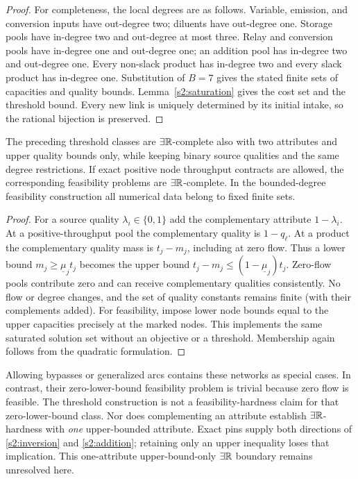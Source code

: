 \begin{proof}
For completeness, the local degrees are as follows. Variable, emission,
and conversion inputs have out-degree two; diluents have out-degree
one. Storage pools have in-degree two and out-degree at most three.
Relay and conversion pools have in-degree one and out-degree one;
an addition pool has in-degree two and out-degree one. Every non-slack
product has in-degree two and every slack product has in-degree one.
Substitution of $B=7$ gives the stated finite sets of capacities and
quality bounds. Lemma~\ref{s2:saturation} gives the cost set and the
threshold bound. Every new link is uniquely determined by its initial
intake, so the rational bijection is preserved.
\end{proof}

\begin{corollary}\label{s2:variants}
The preceding threshold classes are $\exists\mathbb R$-complete also with two
attributes and upper quality bounds only, while keeping binary source
qualities and the same degree restrictions. If exact positive node
throughput contracts are allowed, the corresponding feasibility problems
are $\exists\mathbb R$-complete. In the bounded-degree feasibility construction all
numerical data belong to fixed finite sets.
\end{corollary}
\begin{proof}
For a source quality $\lambda_i\in\{0,1\}$ add the complementary
attribute $1-\lambda_i$. At a positive-throughput pool the complementary
quality is $1-q_\ell$. At a product the complementary quality mass is
$t_j-m_j$, including at zero flow. Thus a lower bound
$m_j\ge\underline\mu_jt_j$ becomes the upper bound
$t_j-m_j\le(1-\underline\mu_j)t_j$. Zero-flow pools contribute zero
and can receive complementary qualities consistently. No flow or degree
changes, and the set of quality constants remains finite (with their
complements added). For feasibility, impose lower node bounds equal
to the upper capacities precisely at the marked nodes. This implements
the same saturated solution set without an objective or a threshold.
Membership again follows from the quadratic formulation.
\end{proof}

Allowing bypasses or generalized arcs contains these networks as special
cases. In contrast, their zero-lower-bound feasibility problem is trivial
because zero flow is feasible. The threshold construction is not a
feasibility-hardness claim for that zero-lower-bound class. Nor does
complementing an attribute establish $\exists\mathbb R$-hardness with \emph{one}
upper-bounded attribute. Exact pins supply both directions of
\eqref{s2:inversion} and \eqref{s2:addition}; retaining only an upper
inequality loses that implication. This one-attribute upper-bound-only
$\exists\mathbb R$ boundary remains unresolved here.

